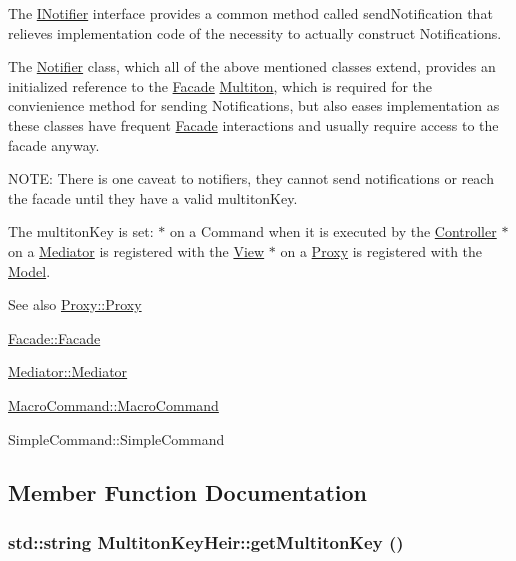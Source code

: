 The {\ttfamily \hyperlink{class_pure_m_v_c_1_1_i_notifier}{INotifier}} interface provides a common method called {\ttfamily sendNotification} that relieves implementation code of the necessity to actually construct {\ttfamily Notifications}.

The {\ttfamily \hyperlink{class_pure_m_v_c_1_1_notifier}{Notifier}} class, which all of the above mentioned classes extend, provides an initialized reference to the {\ttfamily \hyperlink{class_pure_m_v_c_1_1_facade}{Facade}} \hyperlink{class_pure_m_v_c_1_1_multiton}{Multiton}, which is required for the convienience method for sending {\ttfamily Notifications}, but also eases implementation as these classes have frequent {\ttfamily \hyperlink{class_pure_m_v_c_1_1_facade}{Facade}} interactions and usually require access to the facade anyway.

NOTE: There is one caveat to notifiers, they cannot send notifications or reach the facade until they have a valid multitonKey.

The multitonKey is set: $\ast$ on a Command when it is executed by the \hyperlink{class_pure_m_v_c_1_1_controller}{Controller} $\ast$ on a \hyperlink{class_pure_m_v_c_1_1_mediator}{Mediator} is registered with the \hyperlink{class_pure_m_v_c_1_1_view}{View} $\ast$ on a \hyperlink{class_pure_m_v_c_1_1_proxy}{Proxy} is registered with the \hyperlink{class_pure_m_v_c_1_1_model}{Model}.

\begin{DoxySeeAlso}{See also}
\hyperlink{class_pure_m_v_c_1_1_proxy_ab9b9198b6a4aeec5fa06f8a73c1d96f8}{Proxy::Proxy} 

\hyperlink{class_pure_m_v_c_1_1_facade_a8e0f43c604499d9d603236929b3ac488}{Facade::Facade} 

\hyperlink{class_pure_m_v_c_1_1_mediator_ae659a8e8b24a7023a2c4559f840e0ae5}{Mediator::Mediator} 

\hyperlink{class_pure_m_v_c_1_1_macro_command_abf91c7c1114f20b006cf95bf8c4614e7}{MacroCommand::MacroCommand} 

SimpleCommand::SimpleCommand 
\end{DoxySeeAlso}


\subsection{Member Function Documentation}
\hypertarget{class_pure_m_v_c_1_1_multiton_key_heir_aa5622459d33380deb08dc3cab8b991c7}{
\subsubsection[{getMultitonKey}]{\setlength{\rightskip}{0pt plus 5cm}std::string MultitonKeyHeir::getMultitonKey ()}}
\label{class_pure_m_v_c_1_1_multiton_key_heir_aa5622459d33380deb08dc3cab8b991c7}


